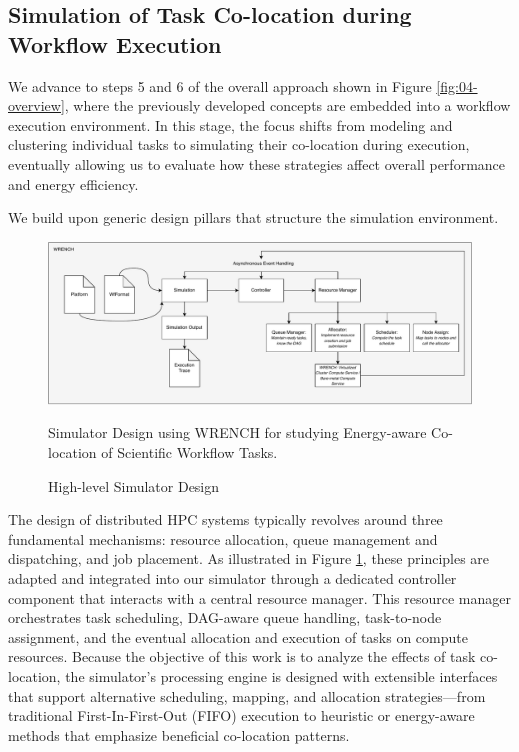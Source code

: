 \subsection{Simulation of Task Co-location during Workflow Execution}
\label{sec:simulation_environment}

We advance to steps 5 and 6 of the overall approach shown in Figure \ref{fig:04-overview}, where the previously developed concepts are embedded into a workflow execution environment. In this stage, the focus shifts from modeling and clustering individual tasks to simulating their co-location during execution, eventually allowing us to evaluate how these strategies affect overall performance and energy efficiency.


\label{sec:design_pillars}
We build upon generic design pillars that structure the simulation environment.

\begin{figure}[H]
    \centering
    \includegraphics[scale=0.5]{fig/04/04-approach-sim.pdf}
    \small
    \caption{High-level Simulator Design}
    \label{fig:04-sim-design}
    \tiny
    Simulator Design using WRENCH for studying Energy-aware Co-location of Scientific Workflow Tasks.
\end{figure}

The design of distributed HPC systems typically revolves around three fundamental mechanisms: resource allocation, queue management and dispatching, and job placement. As illustrated in Figure \ref{fig:04-sim-design}, these principles are adapted and integrated into our simulator through a dedicated controller component that interacts with a central resource manager. This resource manager orchestrates task scheduling, DAG-aware queue handling, task-to-node assignment, and the eventual allocation and execution of tasks on compute resources. Because the objective of this work is to analyze the effects of task co-location, the simulator's processing engine is designed with extensible interfaces that support alternative scheduling, mapping, and allocation strategies—from traditional First-In-First-Out (FIFO) execution to heuristic or energy-aware methods that emphasize beneficial co-location patterns.

